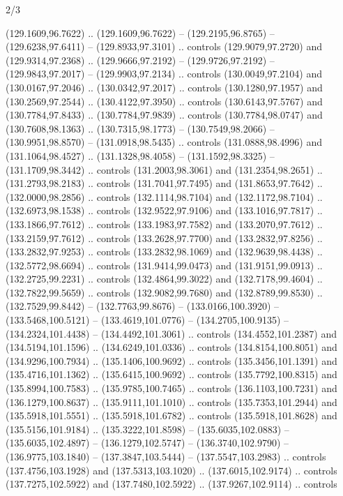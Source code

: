 \begin{flagdescription}{2/3}
\begin{scope}[xshift=0.5\flaglength,yshift=0.5\flagwidth,scale=\flagwidth/180]
\begin{scope}[y=0.8pt, x=0.8pt, yscale=-1,shift={(-168.75,-108.75)}]
  (129.1609,96.7622) .. (129.1609,96.7622) -- (129.2195,96.8765) --
  (129.6238,97.6411) -- (129.8933,97.3101) .. controls (129.9079,97.2720) and
  (129.9314,97.2368) .. (129.9666,97.2192) -- (129.9726,97.2192) --
  (129.9843,97.2017) -- (129.9903,97.2134) .. controls (130.0049,97.2104) and
  (130.0167,97.2046) .. (130.0342,97.2017) .. controls (130.1280,97.1957) and
  (130.2569,97.2544) .. (130.4122,97.3950) .. controls (130.6143,97.5767) and
  (130.7784,97.8433) .. (130.7784,97.9839) .. controls (130.7784,98.0747) and
  (130.7608,98.1363) .. (130.7315,98.1773) -- (130.7549,98.2066) --
  (130.9951,98.8570) -- (131.0918,98.5435) .. controls (131.0888,98.4996) and
  (131.1064,98.4527) .. (131.1328,98.4058) -- (131.1592,98.3325) --
  (131.1709,98.3442) .. controls (131.2003,98.3061) and (131.2354,98.2651) ..
  (131.2793,98.2183) .. controls (131.7041,97.7495) and (131.8653,97.7642) ..
  (132.0000,98.2856) .. controls (132.1114,98.7104) and (132.1172,98.7104) ..
  (132.6973,98.1538) .. controls (132.9522,97.9106) and (133.1016,97.7817) ..
  (133.1866,97.7612) .. controls (133.1983,97.7582) and (133.2070,97.7612) ..
  (133.2159,97.7612) .. controls (133.2628,97.7700) and (133.2832,97.8256) ..
  (133.2832,97.9253) .. controls (133.2832,98.1069) and (132.9639,98.4438) ..
  (132.5772,98.6694) .. controls (131.9414,99.0473) and (131.9151,99.0913) ..
  (132.2725,99.2231) .. controls (132.4864,99.3022) and (132.7178,99.4604) ..
  (132.7822,99.5659) .. controls (132.9082,99.7680) and (132.8789,99.8530) ..
  (132.7529,99.8442) -- (132.7763,99.8676) -- (133.0166,100.3920) --
  (133.5468,100.5121) -- (133.4619,101.0776) -- (134.2705,100.9135) --
  (134.2324,101.4438) -- (134.4492,101.3061) .. controls (134.4552,101.2387) and
  (134.5194,101.1596) .. (134.6249,101.0336) .. controls (134.8154,100.8051) and
  (134.9296,100.7934) .. (135.1406,100.9692) .. controls (135.3456,101.1391) and
  (135.4716,101.1362) .. (135.6415,100.9692) .. controls (135.7792,100.8315) and
  (135.8994,100.7583) .. (135.9785,100.7465) .. controls (136.1103,100.7231) and
  (136.1279,100.8637) .. (135.9111,101.1010) .. controls (135.7353,101.2944) and
  (135.5918,101.5551) .. (135.5918,101.6782) .. controls (135.5918,101.8628) and
  (135.5156,101.9184) .. (135.3222,101.8598) -- (135.6035,102.0883) --
  (135.6035,102.4897) -- (136.1279,102.5747) -- (136.3740,102.9790) --
  (136.9775,103.1840) -- (137.3847,103.5444) -- (137.5547,103.2983) .. controls
  (137.4756,103.1928) and (137.5313,103.1020) .. (137.6015,102.9174) .. controls
  (137.7275,102.5922) and (137.7480,102.5922) .. (137.9267,102.9114) .. controls

\end{scope}
\end{scope}
\end{flagdescription}

